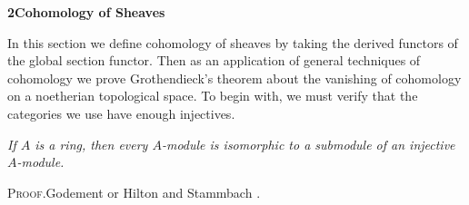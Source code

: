 {\par\bigskip\noindent\hypertarget{sec-III-2}{}{\large\bfseries 2\enspace Cohomology of Sheaves}\par\medskip
\noindent In this section we define cohomology of sheaves by taking the derived functors of the global section functor. Then as an application of general techniques of cohomology we prove Grothendieck's theorem about the vanishing of cohomology on a noetherian topological space. To begin with, we must verify that the categories we use have enough injectives.

 \emph{If $A$ is a ring, then every $A$-module is isomorphic to a submodule of an injective $A$-module.}

\par\smallskip\noindent\textsc{Proof.}\enspace Godement  or Hilton and Stammbach .
}
